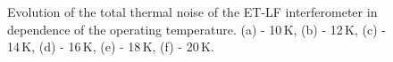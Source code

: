\begin{figure}[!h]
\begin{center}
\end{center}
\caption{Evolution of the total thermal noise of the ET-LF interferometer in dependence of the operating temperature. (a) - 10\,K, (b) - 12\,K, (c) - 14\,K, (d) - 16\,K, (e) - 18\,K, (f) - 20\,K.}
\label{fig:tn_etlf1}
\end{figure}

\newpage

